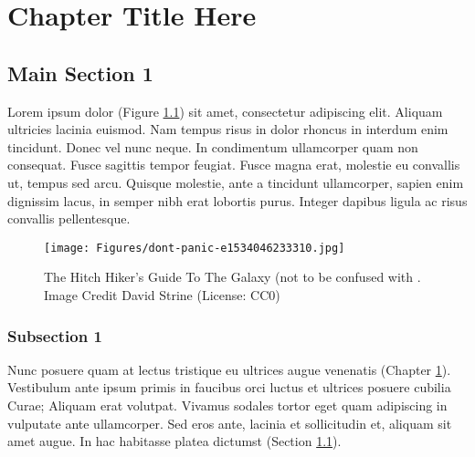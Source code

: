 

\chapter{Chapter Title Here}\label{chapter:firstchapter} %

\label{ChapterX} %


\section{Main Section 1}\label{sec:firstsection}

Lorem ipsum dolor (Figure \ref{fig:ThisFig}) sit amet, consectetur adipiscing elit\cite{fleischman1994pragmatics}.
Aliquam ultricies lacinia euismod.
Nam tempus risus in dolor rhoncus in interdum enim tincidunt.
Donec vel nunc neque.
In condimentum ullamcorper quam non consequat.
Fusce sagittis tempor feugiat.
Fusce magna erat, molestie eu convallis ut, tempus sed arcu.
Quisque molestie, ante a tincidunt ullamcorper, sapien enim dignissim lacus, in semper nibh erat lobortis purus.
Integer dapibus ligula ac risus convallis pellentesque.

\begin{figure}
\begin{centering}
\texttt{[image: Figures/dont-panic-e1534046233310.jpg]}
\caption{The Hitch Hiker's Guide To The Galaxy (not to be confused with \cite{Reference1}. Image Credit David Strine (License: CC0)}
\label{fig:ThisFig}
\end{centering}
\end{figure}

\subsection{Subsection 1}

Nunc posuere quam at lectus tristique eu ultrices augue venenatis (Chapter \ref{chapter:firstchapter}).
Vestibulum ante ipsum primis in faucibus orci luctus et ultrices posuere cubilia Curae; Aliquam erat volutpat.
Vivamus sodales tortor eget quam adipiscing in vulputate ante ullamcorper.
Sed eros ante, lacinia et sollicitudin et, aliquam sit amet augue.
In hac habitasse platea dictumst (Section \ref{sec:firstsection}).

